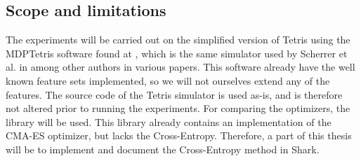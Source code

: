 \subsection{Scope and limitations \label{section:scope}}


The experiments will be carried out on the simplified version of
Tetris using the MDPTetris software found at \citep{mdptetris},
which is the same simulator used by Scherrer et al. in \citep{scherrer2009:b} 
among other authors in various papers.
This software already have the well known feature sets
implemented, so we will not ourselves extend any of the features.
The source code of the Tetris simulator is used as-is, and is therefore 
not altered prior to running the experiments. 
For comparing the optimizers, the \shark library will be used. 
This library already contains an
implementation of the CMA-ES optimizer, but lacks the 
Cross-Entropy. Therefore, a part of this thesis will
be to implement and document the Cross-Entropy method in Shark.




